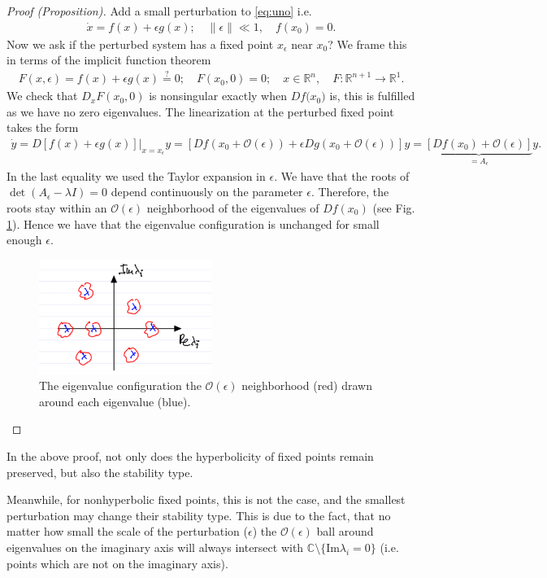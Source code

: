 \begin{proof}[Proof (Proposition)]
	Add a small perturbation to \eqref{eq:uno} i.e.
\begin{align}
	\dot{{x} } = f({x}) + \epsilon g({x} );\quad \|\epsilon \| \ll 1,\quad f({x} _0) =0.
\end{align}
Now we ask if the perturbed system has a fixed point ${x} _{\epsilon}$ near ${x} _0$? We frame this in terms of the implicit function theorem
\begin{align}
	F({x} ,\epsilon) = f({x} ) + \epsilon g({x} ) \stackrel{?}{=} 0;\quad F({x}_0, 0) = 0;\quad {x} \in \mathbb{R}^{n}, \quad F:\mathbb{R}^{n+1} \to \mathbb{R}^{1}.
\end{align}
We check that $D_{{x} }F({x_0} ,0) $ is nonsingular exactly when $Df({x_0)} $ is, this is fulfilled as we have no zero eigenvalues. The linearization at the perturbed fixed point takes the form
\begin{align}
	\dot{{y} } = D \left. \left[ f({x} ) + \epsilon g({x} ) \right]\right|_{{x} = {x_\epsilon} }{y} = \left[ Df({x_0}  + \mathcal{O}(\epsilon)) + \epsilon Dg({x_0} + \mathcal{O}(\epsilon)) \right] {y} 
		=\underbrace{ \left[ Df({x_0})+ \mathcal{O}(\epsilon) \right]}_{={A_{\epsilon}} }{y}.
\end{align}
In the last equality we used the Taylor expansion in $\epsilon$. We have that the roots of $\det({A_{\epsilon}}-\lambda {I} ) = 0 $ depend continuously on the parameter $\epsilon$. Therefore, the roots stay within an $\mathcal{O}(\epsilon)$ neighborhood of the eigenvalues of $Df({x_0} )$ (see Fig. \ref{fig:eps_ball_eigv}). Hence we have that the eigenvalue configuration is unchanged for small enough $\epsilon$.
\begin{figure}[h!]
	\centering
	\includegraphics[width=0.5\textwidth]{figures/ch2/16eps_ball_eigv.png}
	\caption{The eigenvalue configuration the $\mathcal{O}(\epsilon)$ neighborhood (red) drawn around each eigenvalue (blue).}
	\label{fig:eps_ball_eigv}
\end{figure}
\end{proof}
\begin{remark}[]
	In the above proof, not only does the hyperbolicity of fixed points remain preserved, but also the stability type.
\end{remark}
Meanwhile, for nonhyperbolic fixed points, this is not the case, and the smallest perturbation may change their stability type. This is due to the fact, that no matter how small the scale of the perturbation ($\epsilon$) the $\mathcal{O}(\epsilon)$ ball around eigenvalues on the imaginary axis will always intersect with $\mathbb{C}\setminus \{  \textrm{Im}\lambda_i =0 \}$ (i.e. points which are not on the imaginary axis).

